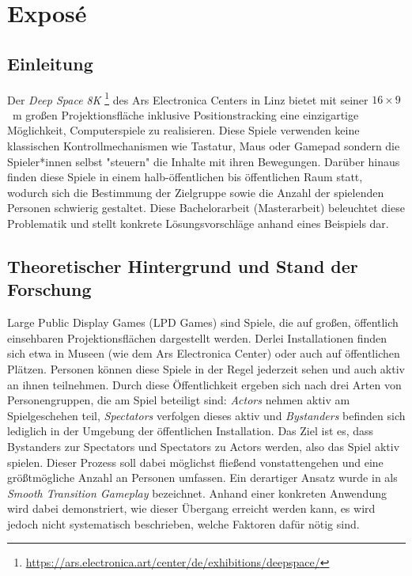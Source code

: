 \chapter{Exposé}

\section{Einleitung}

Der \emph{Deep Space 8K}%
\footnote{\url{https://ars.electronica.art/center/de/exhibitions/deepspace/}}
des Ars Electronica Centers in Linz bietet mit seiner $16 \times 9$~m
großen Projektionsfläche inklusive Positionstracking eine einzigartige
Möglichkeit, Computerspiele zu realisieren. Diese Spiele verwenden keine
klassischen Kontrollmechanismen wie Tastatur, Maus oder Gamepad sondern die
Spieler*innen selbst "steuern" die Inhalte mit ihren Bewegungen. Darüber
hinaus finden diese Spiele in einem halb-öffentlichen bis öffentlichen Raum
statt, wodurch sich die Bestimmung der Zielgruppe sowie die Anzahl der
spielenden Personen schwierig gestaltet. Diese Bachelorarbeit (Masterarbeit)
beleuchtet diese Problematik und stellt konkrete Lösungsvorschläge anhand
eines Beispiels dar.


\section{Theoretischer Hintergrund und Stand der Forschung}
\label{sec:hintergrund}

Large Public Display Games (LPD Games) sind Spiele, die auf großen,
öffentlich einsehbaren Projektionsflächen dargestellt werden. Derlei
Installationen finden sich etwa in Museen (wie dem Ars Electronica Center)
oder auch auf öffentlichen Plätzen. Personen können diese Spiele in der Regel
jederzeit sehen und auch aktiv an ihnen teilnehmen. Durch diese
Öffentlichkeit ergeben sich nach \cite{Finke2008} drei Arten von
Personengruppen, die am Spiel beteiligt sind: \emph{Actors} nehmen aktiv am
Spielgeschehen teil, \emph{Spectators} verfolgen dieses aktiv und
\emph{Bystanders} befinden sich lediglich in der Umgebung der öffentlichen
Installation. Das Ziel ist es, dass Bystanders zur Spectators und Spectators
zu Actors werden, also das Spiel aktiv spielen. Dieser Prozess soll dabei
möglichst fließend vonstattengehen und eine größtmögliche Anzahl an Personen
umfassen. Ein derartiger Ansatz wurde in \cite{Hochleitner2013} als
\emph{Smooth Transition Gameplay} bezeichnet. Anhand einer konkreten
Anwendung wird dabei demonstriert, wie dieser Übergang erreicht werden kann,
es wird jedoch nicht systematisch beschrieben, welche Faktoren dafür nötig sind.

